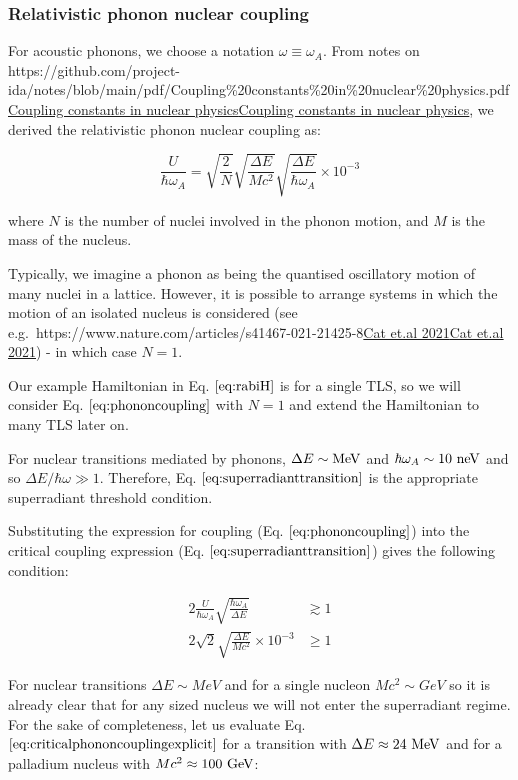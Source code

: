 \documentclass[
]{article}
\let\oldhref\href
\renewcommand{\href}[2]{\ifx#1\urlprefix\oldhref{#1}{#2}\else\uline{\oldhref{#1}{#2}}\fi}
\renewcommand{\[}{\begin{equation}}
\renewcommand{\]}{\end{equation}}
\begin{document}
\subsubsection{Relativistic phonon nuclear
coupling}\label{relativistic-phonon-nuclear-coupling}

For acoustic phonons, we choose a notation \(\omega \equiv \omega_A\).
From notes on
\href{https://github.com/project-ida/notes/blob/main/pdf/Coupling\%20constants\%20in\%20nuclear\%20physics.pdf}{Coupling
constants in nuclear physics}, we derived the relativistic phonon
nuclear coupling as:

\[
\frac{U}{\hbar \omega_A} = \sqrt{\frac{2}{N}} \sqrt{\frac{\Delta E}{M c^2}} \sqrt{\frac{\Delta E}{\hbar \omega_A}} \times 10^{-3}
\label{eq:phononcoupling}
\]

where \(N\) is the number of nuclei involved in the phonon motion, and
\(M\) is the mass of the nucleus.

Typically, we imagine a phonon as being the quantised oscillatory motion
of many nuclei in a lattice. However, it is possible to arrange systems
in which the motion of an isolated nucleus is considered (see
e.g.~\href{https://www.nature.com/articles/s41467-021-21425-8}{Cat et.al
2021}) - in which case \(N=1\).

Our example Hamiltonian in Eq. \(\ref{eq:rabiH}\) is for a single TLS,
so we will consider Eq. \(\ref{eq:phononcoupling}\) with \(N=1\) and
extend the Hamiltonian to many TLS later on.

For nuclear transitions mediated by phonons, \(\Delta E \sim \rm MeV\)
and \(\hbar\omega_A \sim 10 \ \rm neV\) and so
\(\Delta E/\hbar\omega \gg 1\). Therefore, Eq.
\(\ref{eq:superradianttransition}\) is the appropriate superradiant
threshold condition.

Substituting the expression for coupling (Eq.
\(\ref{eq:phononcoupling}\)) into the critical coupling expression (Eq.
\(\ref{eq:superradianttransition}\)) gives the following condition:

\[
\begin{aligned}
2\frac{U}{\hbar\omega_A}\sqrt{\frac{\hbar\omega_A}{\Delta E}} &\gtrsim 1 \\
2\sqrt{2} \sqrt{\frac{\Delta E}{M c^2}}  \times 10^{-3} &\ge 1
\end{aligned}
\label{eq:criticalphononcouplingexplicit}
\]

For nuclear transitions \(\Delta E \sim MeV\) and for a single nucleon
\(Mc^2 \sim GeV\) so it is already clear that for any sized nucleus we
will not enter the superradiant regime. For the sake of completeness,
let us evaluate Eq. \(\ref{eq:criticalphononcouplingexplicit}\) for a
transition with \(\Delta E \approx 24  \ \rm MeV\) and for a palladium
nucleus with \(Mc^2 \approx 100  \ \rm GeV\):
\end{document}
